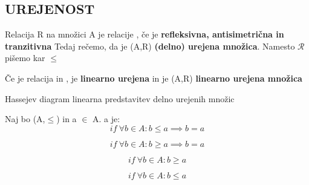 \subsection{UREJENOST}
\begin{frame}
    \subsectionpage
\end{frame}

\begin{frame}
    \centering
    Relacija R na množici A je relacije  ,
    \pause
    \bigbreak
    če je \textbf{refleksivna, antisimetrična in tranzitivna}
    \bigbreak
    Tedaj rečemo, da je (A,R) \textbf{(delno) urejena množica}.
    \bigbreak
    Namesto $\mathcal{R}$ pišemo kar $\leq$
        
\end{frame}

\begin{slajd}
  {Če je relacija  in ,}  
    {je \textbf{linearno urejena} in je (A,R) \textbf{linearno urejena množica}}
\end{slajd}

\begin{frame}
    \begin{alertblock}{Hassejev diagram}
        linearna predstavitev delno urejenih množic
    \end{alertblock}
\end{frame}

\begin{slajd}
{Naj bo (A,$\leq$) in a $\in$ A. a je:
\bigbreak
    }
{\begin{displaymath}
if \ \forall b \in A: b \leq a \implies b=a
\end{displaymath}}
\end{slajd}

\begin{slajd}
{}
{\begin{displaymath}
if \ \forall b \in A: b \geq a \implies b=a
\end{displaymath}}
\end{slajd}


\begin{slajd}
{}
{\begin{displaymath}
if \ \forall b \in A: b \geq a 
\end{displaymath}}
\end{slajd}

\begin{slajd}
{}
{\begin{displaymath}
if \ \forall b \in A: b \leq a 
\end{displaymath}}
\end{slajd}

